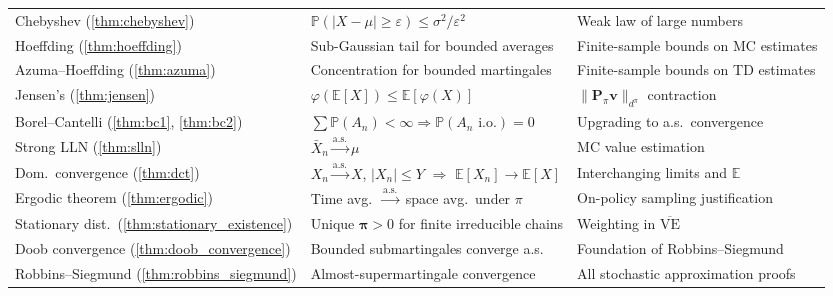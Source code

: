 \documentclass[11pt,a4paper]{article}
\theoremstyle{definition}
\theoremstyle{plain}
\theoremstyle{remark}
\newcommand{\E}{\mathbb{E}}
\newcommand{\Prob}{\mathbb{P}}
\newcommand{\cas}{\xrightarrow{\text{a.s.}}}
\begin{document}
\begin{center}
\begin{tabular}{p{3.8cm} p{5cm} p{5cm}}
Chebyshev (\ref{thm:chebyshev}) & $\Prob(|X - \mu| \geq \varepsilon) \leq \sigma^2/\varepsilon^2$ & Weak law of large numbers \\
\addlinespace
Hoeffding (\ref{thm:hoeffding}) & Sub-Gaussian tail for bounded averages & Finite-sample bounds on MC estimates \\
\addlinespace
Azuma--Hoeffding (\ref{thm:azuma}) & Concentration for bounded martingales & Finite-sample bounds on TD estimates \\
\addlinespace
Jensen's (\ref{thm:jensen}) & $\varphi(\E[X]) \leq \E[\varphi(X)]$ & $\|\mathbf{P}_\pi \mathbf{v}\|_{d^\pi}$ contraction \\
\addlinespace
Borel--Cantelli (\ref{thm:bc1}, \ref{thm:bc2}) & $\sum \Prob(A_n) < \infty \Rightarrow \Prob(A_n \text{ i.o.}) = 0$ & Upgrading to a.s.\ convergence \\
\addlinespace
Strong LLN (\ref{thm:slln}) & $\bar{X}_n \cas \mu$ & MC value estimation \\
\addlinespace
Dom.\ convergence (\ref{thm:dct}) & $X_n \cas X$, $|X_n| \leq Y$ $\Rightarrow$ $\E[X_n] \to \E[X]$ & Interchanging limits and $\E$ \\
\addlinespace
Ergodic theorem (\ref{thm:ergodic}) & Time avg.\ $\cas$ space avg.\ under $\pi$ & On-policy sampling justification \\
\addlinespace
Stationary dist.\ (\ref{thm:stationary_existence}) & Unique $\boldsymbol{\pi} > 0$ for finite irreducible chains & Weighting in $\overline{\text{VE}}$ \\
\addlinespace
Doob convergence (\ref{thm:doob_convergence}) & Bounded submartingales converge a.s. & Foundation of Robbins--Siegmund \\
\addlinespace
Robbins--Siegmund (\ref{thm:robbins_siegmund}) & Almost-supermartingale convergence & All stochastic approximation proofs \\
\bottomrule
\end{tabular}
\end{center}
\end{document}
